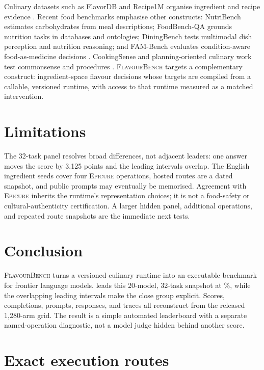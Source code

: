 \documentclass[10pt,twocolumn]{article}
\newcommand{\system}{\textsc{FlavourBench}}
\newcommand{\epicure}{\textsc{Epicure}}
\begin{document}
Culinary datasets such as FlavorDB and Recipe1M organise ingredient and recipe evidence
\cite{garg2018flavordb,salvador2017recipe1m}. Recent food benchmarks emphasise other constructs:
NutriBench estimates carbohydrates from meal descriptions; FoodBench-QA grounds nutrition tasks in
databases and ontologies; DiningBench tests multimodal dish perception and nutrition reasoning; and
FAM-Bench evaluates condition-aware food-as-medicine decisions
\cite{hua2025nutribench,eftimov2026foodbench,jin2026diningbench,mao2026fambench}. CookingSense and
planning-oriented culinary work test commonsense and procedures
\cite{choi2024cookingsense,wu2025recipe2plan}. \system{} targets a complementary construct:
ingredient-space flavour decisions whose targets are compiled from a callable, versioned runtime,
with access to that runtime measured as a matched intervention.

\section{Limitations}

The 32-task panel resolves broad differences, not adjacent leaders: one answer moves the score by
3.125 points and the leading intervals overlap. The English ingredient seeds cover four
\epicure{} operations, hosted routes are a dated snapshot, and public prompts may eventually be
memorised. Agreement with \epicure{} inherits the runtime's representation choices; it is not a
food-safety or cultural-authenticity certification. A larger hidden panel, additional operations,
and repeated route snapshots are the immediate next tests.

\section{Conclusion}

\system{} turns a versioned culinary runtime into an executable benchmark for frontier language
models. \FBTopModel{} leads this 20-model, 32-task snapshot at \FBTopScore{}\%, while the overlapping
leading intervals make the close group explicit. Scores, completions, prompts, responses, and
traces all reconstruct from the released 1,280-arm grid. The result is a simple automated
leaderboard with a separate named-operation diagnostic, not a model judge hidden behind another
score.

\clearpage
\appendix

\section{Exact execution routes}
\label{app:routes}
\end{document}
